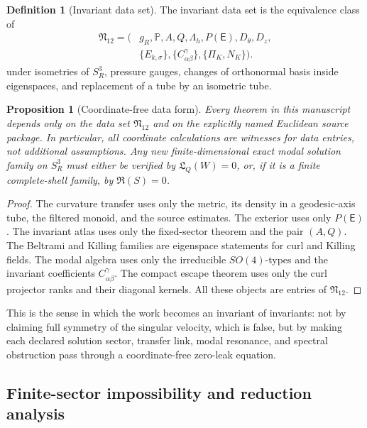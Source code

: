 \documentclass[aps,prd,reprint,superscriptaddress,nofootinbib,floatfix]{revtex4-2}
\newtheorem{proposition}[theorem]{Proposition}
\theoremstyle{definition}
\newtheorem{definition}[theorem]{Definition}
\theoremstyle{remark}
\newcommand{\PP}{\mathbb{P}}
\begin{document}
\begin{definition}[Invariant data set]
	The invariant data set is the equivalence class of
	\[
		\begin{aligned}
			\mathfrak N_{12}=\big( & g_R,\PP,A,Q,\Lambda_h,P(\mathsf E),D_\theta,D_z,                  \\
			                       & \{E_{k,\sigma}\},\{C_{\alpha\beta}^{\gamma}\},\{\Pi_K,N_K\}\big).
		\end{aligned}
	\]
	under isometries of \(S^3_R\), pressure gauges, changes of orthonormal basis inside eigenspaces, and replacement of a tube by an isometric tube.
\end{definition}

\begin{proposition}[Coordinate-free data form]\label{prop:dataform}
	Every theorem in this manuscript depends only on the data set \(\mathfrak N_{12}\) and on the explicitly named Euclidean source package.  In particular, all coordinate calculations are witnesses for data entries, not additional assumptions.  Any new finite-dimensional exact modal solution family on \(S^3_R\) must either be verified by \(\mathfrak L_Q(W)=0\), or, if it is a finite complete-shell family, by \(\mathfrak R(S)=0\).
\end{proposition}

\begin{proof}
	The curvature transfer uses only the metric, its density in a geodesic-axis tube, the filtered monoid, and the source estimates.  The exterior uses only \(P(\mathsf E)\).  The invariant atlas uses only the fixed-sector theorem and the pair \((A,Q)\).  The Beltrami and Killing families are eigenspace statements for curl and Killing fields.  The modal algebra uses only the irreducible \(SO(4)\)-types and the invariant coefficients \(C_{\alpha\beta}^{\gamma}\).  The compact escape theorem uses only the curl projector ranks and their diagonal kernels.  All these objects are entries of \(\mathfrak N_{12}\).
\end{proof}

This is the sense in which the work becomes an invariant of invariants: not by claiming full symmetry of the singular velocity, which is false, but by making each declared solution sector, transfer link, modal resonance, and spectral obstruction pass through a coordinate-free zero-leak equation.


\subsection{Finite-sector impossibility and reduction analysis}
\label{subsec:finite-sector-impossibility}
\end{document}
